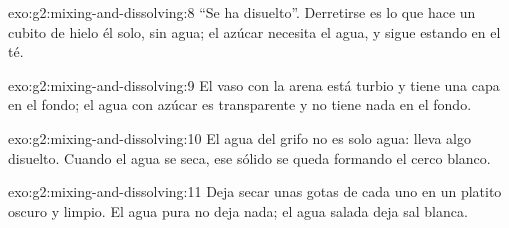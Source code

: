 \begin{solution}{exo:g2:mixing-and-dissolving:8}
``Se ha disuelto''. Derretirse es lo que hace un cubito de hielo él
solo, sin agua; el azúcar necesita el agua, y sigue estando en el té.
\end{solution}

\begin{solution}{exo:g2:mixing-and-dissolving:9}
El vaso con la arena está turbio y tiene una capa en el fondo; el agua
con azúcar es transparente y no tiene nada en el fondo.
\end{solution}

\begin{solution}{exo:g2:mixing-and-dissolving:10}
El agua del grifo no es solo agua: lleva algo disuelto. Cuando el agua
se seca, ese sólido se queda formando el cerco blanco.
\end{solution}

\begin{solution}{exo:g2:mixing-and-dissolving:11}
Deja secar unas gotas de cada uno en un platito oscuro y limpio. El
agua pura no deja nada; el agua salada deja sal blanca.
\end{solution}
